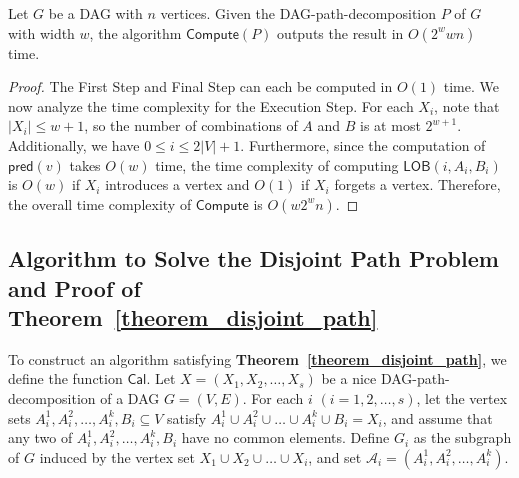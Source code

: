 \documentclass[runningheads]{llncs}
\theoremstyle{plain}
\theoremstyle{definition}
\begin{document}
\begin{lemma}\label{complexity_lob}
    Let $G$ be a DAG with $n$ vertices. Given the DAG-path-decomposition $P$ of $G$ with width $w$, the algorithm $\mathsf{Compute}(P)$ outputs the result in $O(2^w w n)$ time.
\end{lemma}
    
\begin{proof}
    The First Step and Final Step can each be computed in $O(1)$ time. We now analyze the time complexity for the Execution Step. For each $X_i$, note that $|X_i| \leq w+1$, so the number of combinations of $A$ and $B$ is at most $2^{w+1}$. Additionally, we have $0 \leq i \leq 2|V|+1$. Furthermore, since the computation of $\mathsf{pred}(v)$ takes $O(w)$ time, the time complexity of computing $\mathsf{LOB}(i, A_i, B_i)$ is $O(w)$ if $X_i$ introduces a vertex and $O(1)$ if $X_i$ forgets a vertex. Therefore, the overall time complexity of $\mathsf{Compute}$ is $O(w 2^w n)$.
\end{proof}












\subsection{Algorithm to Solve the Disjoint Path Problem and Proof of \textbf{Theorem~\ref{theorem_disjoint_path}}}\label{appendix_B6}

To construct an algorithm satisfying \textbf{Theorem~\ref{theorem_disjoint_path}}, we define the function $\mathsf{Cal}$. Let $X = (X_1, X_2, \dots, X_s)$ be a nice DAG-path-decomposition of a DAG $G = (V, E)$. For each $i$ $(i = 1, 2, \dots, s)$, let the vertex sets $A^1_i, A^2_i, \dots, A^k_i, B_i \subseteq V$ satisfy $A^1_i \cup A^2_i \cup \dots \cup A^k_i \cup B_i = X_i$, and assume that any two of $A^1_i, A^2_i, \dots, A^k_i, B_i$ have no common elements. Define $G_i$ as the subgraph of $G$ induced by the vertex set $X_1 \cup X_2 \cup \dots \cup X_i$, and set $\mathscr{A}_i = (A^1_i, A^2_i, \dots, A^k_i)$.
\end{document}
